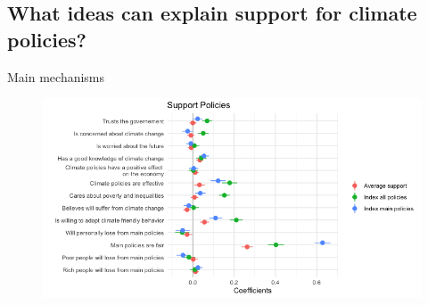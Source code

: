 \begin{framefont}{\small}
\section{What ideas can explain support for climate policies?}

\begin{frame}{Main mechanisms}
\begin{figure}
	\includegraphics[width=.9\paperwidth]{../figures/FR/reg_support_policies_ABC_FR.png}
\end{figure}
\end{frame}


\end{framefont}
